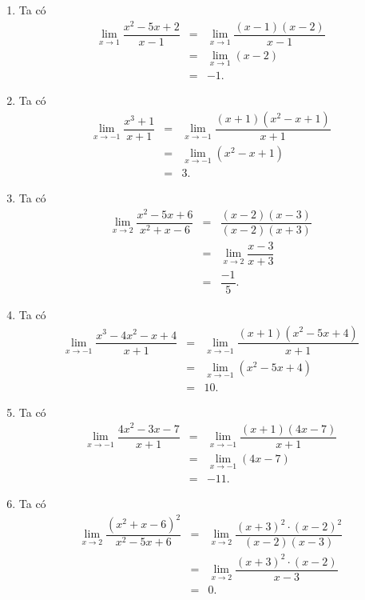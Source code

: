 \begin{ex}
{\begin{enumerate}
\begin{eqnarray*}
				&=& -6. 
			\end{eqnarray*}
			\item Ta có 
			\begin{eqnarray*}
				\displaystyle\lim_{x  \to 1} \dfrac{x^2 - 5x + 2}{x - 1}
				&=& \displaystyle\lim_{x \to 1} \dfrac{(x - 1)(x - 2)}{x - 1}\\ 
				&=& \displaystyle\lim_{x \to 1}  (x - 2)\\
				&=&-1. 
			\end{eqnarray*}
			\item  Ta có
			\begin{eqnarray*}
				\displaystyle\lim_{x \to -1} \dfrac{x^3 + 1}{x + 1} 
				&=& \displaystyle\lim_{x \to -1}\dfrac{(x  + 1)(x^2 - x + 1)}{x + 1}\\
				&=& \displaystyle\lim_{x \to -1} (x^2 - x +  1)\\
				&=&  3.
			\end{eqnarray*}
			\item  Ta có
			\begin{eqnarray*}
				 \displaystyle\lim_{x \to 2} \dfrac{x^2 - 5x + 6}{x^2 + x - 6}
				&=& \dfrac{(x -  2)(x - 3)}{(x - 2)(x + 3)}\\
				 &=& \displaystyle\lim_{x \to 2} \dfrac{x - 3}{x + 3}\\
				&=&  \dfrac{-1}{5}.
			\end{eqnarray*}
			\item Ta có 
			\begin{eqnarray*}
				\displaystyle\lim_{x \to -1} \dfrac{x^3 - 4x^2 -  x + 4}{x + 1}
				&=&\displaystyle\lim_{x \to -1} \dfrac{(x+1)(x^2-5x+4)}{x  + 1} \\
				&=&\displaystyle\lim_{x  \to -1} (x^2-5x+4)\\
				&=&10. 
			\end{eqnarray*}
			\item  Ta có
			\begin{eqnarray*}
				\displaystyle\lim_{x \to -1} \dfrac{4x^2  - 3x - 7}{x + 1}
				&=& \displaystyle\lim_{x \to -1}  \dfrac{(x+1)(4x-7)}{x + 1} \\
				 &=& \displaystyle\lim_{x \to -1} (4x-7)\\
				 &=& -11.
			\end{eqnarray*}
			\item  Ta có
			\begin{eqnarray*}
				\displaystyle\lim_{x  \to 2} \dfrac{(x^2 + x - 6)^2}{x^2 - 5x + 6}
				&=&  \displaystyle\lim_{x\to 2} \dfrac{(x+3)^2\cdot (x-2)^2}{(x-2)(x-3)}\\
				&=&  \displaystyle\lim_{x\to 2} \dfrac{(x+3)^2\cdot (x-2)}{x-3}\\
				 &=& 0.
			\end{eqnarray*}
		\end{enumerate}
	} 
\end{ex}

